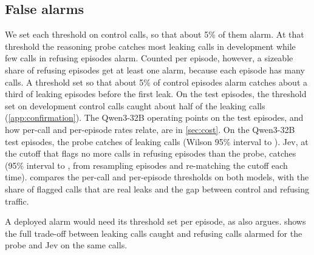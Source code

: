 \subsection{False alarms}
\label{app:alarms}

We set each threshold on control calls, so that about 5\% of them alarm.
At that threshold the reasoning probe catches most leaking calls in development while few calls in refusing episodes alarm.
Counted per episode, however, a sizeable share of refusing episodes get at least one alarm, because each episode has many calls.
A threshold set so that about 5\% of control episodes alarm catches about a third of leaking episodes before the first leak.
On the test episodes, the threshold set on development control calls caught about half of the leaking calls (\cref{app:confirmation}).
The Qwen3-32B operating points on the test episodes, and how per-call and per-episode rates relate, are in \cref{sec:cost}.
On the Qwen3-32B test episodes, the probe catches \qwenFreshProbeCaughtWilson{} of leaking calls (Wilson 95\% interval \qwenFreshProbeCaughtWilsonLow{} to \qwenFreshProbeCaughtWilsonHigh{}).
Jev, at the cutoff that flags no more calls in refusing episodes than the probe, catches \qwenMatchedJevCaught{} (95\% interval \qwenMatchedJevCaughtLow{} to \qwenMatchedJevCaughtHigh{}, from resampling episodes and re-matching the cutoff each time).
 compares the per-call and per-episode thresholds on both models, with the share of flagged calls that are real leaks and the gap between control and refusing traffic.

\begin{table}[h]
  \centering
  \footnotesize
  \setlength{\tabcolsep}{3pt}
  
  \caption{Per-call and per-episode thresholds on the test episodes: precision of the flagged calls, leaking episodes caught by their first leak, refusing episodes and calls flagged, and the same rates on control traffic. Recruiting calls come from leaking and refusing episodes; control calls come from control episodes and are counted separately. Jev's per-call row uses the cutoff that flags no more refusing calls than the probe. Precision counts every flagged recruiting call, including calls before the leak in leaking episodes, so its denominator is not the sum of the other columns.}
  \label{tab:episode-calibration}
\end{table}
A deployed alarm would need its threshold set per episode, as \citet{gao2026} also argues.
 shows the full trade-off between leaking calls caught and refusing calls alarmed for the probe and Jev on the same calls.

